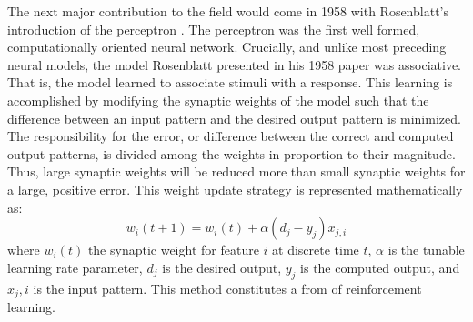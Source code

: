 \documentclass[11pt]{afthesis}
\begin{document}
	The next major contribution to the field would come in 1958 with Rosenblatt's introduction of the perceptron \cite{rosenblatt1958perceptron}. The perceptron was the first \cite{anderson1988neurocomputing} well formed, computationally oriented neural network. Crucially, and unlike most preceding neural models, the model Rosenblatt presented in his  1958 paper was associative. That is, the model learned to associate stimuli with a response. This learning is accomplished by modifying the synaptic weights of the model such that the difference between an input pattern and the desired output pattern is minimized. The responsibility for the error, or difference between the correct and computed output patterns, is divided among the weights in proportion to their magnitude. Thus, large synaptic weights will be reduced more than small synaptic weights for a large, positive error. This weight update strategy is represented mathematically as: \begin{equation} 
	w_i(t+1) = w_i(t) + \alpha(d_j - y_j)x_{j,i}
	\end{equation} where \begin{math} w_i(t) \end{math} the synaptic weight for feature \begin{math} i \end{math} at discrete time \begin{math} t \end{math}, \begin{math} \alpha \end{math} is the tunable learning rate parameter, \begin{math} d_j \end{math} is the desired output, \begin{math} y_j \end{math} is the computed output, and \begin{math} x_j,i \end{math} is the input pattern. This method constitutes a from of reinforcement learning.
	
\end{document}
